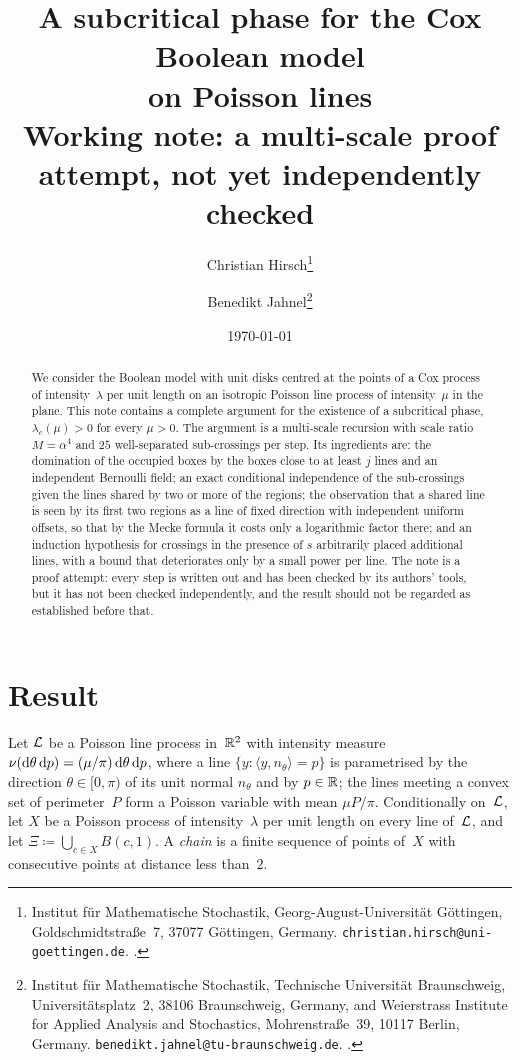 \documentclass[11pt,letterpaper]{article}
\title{\textbf{A subcritical phase for the Cox Boolean model\\ on Poisson lines}\\[0.6em] \large Working note: a multi-scale proof attempt, not yet independently checked}
\author{%
  Christian Hirsch\thanks{Institut f\"ur Mathematische Stochastik, Georg-August-Universit\"at G\"ottingen, Goldschmidtstra\ss e~7, 37077 G\"ottingen, Germany. \texttt{christian.hirsch@uni-goettingen.de}. \orcid{0000-0003-4136-3740}.}
  \and
  Benedikt Jahnel\thanks{Institut f\"ur Mathematische Stochastik, Technische Universit\"at Braunschweig, Universit\"atsplatz~2, 38106 Braunschweig, Germany, and Weierstrass Institute for Applied Analysis and Stochastics, Mohrenstra\ss e~39, 10117 Berlin, Germany. \texttt{benedikt.jahnel@tu-braunschweig.de}. \orcid{0000-0002-4212-0065}.}%
}
\date{\today}
\begin{document}
\maketitle
\thispagestyle{plain}

\begin{abstract}
We consider the Boolean model with unit disks centred at the points of a Cox process of intensity~$\lambda$ per unit length on an isotropic Poisson line process of intensity~$\mu$ in the plane. This note contains a complete argument for the existence of a subcritical phase, $\lambda_c(\mu)>0$ for every $\mu>0$. The argument is a multi-scale recursion with scale ratio $M=\alpha^{4}$ and $25$ well-separated sub-crossings per step. Its ingredients are: the domination of the occupied boxes by the boxes close to at least $j$ lines and an independent Bernoulli field; an exact conditional independence of the sub-crossings given the lines shared by two or more of the regions; the observation that a shared line is seen by its first two regions as a line of fixed direction with independent uniform offsets, so that by the Mecke formula it costs only a logarithmic factor there; and an induction hypothesis for crossings in the presence of $s$ arbitrarily placed additional lines, with a bound that deteriorates only by a small power per line. The note is a proof attempt: every step is written out and has been checked by its authors' tools, but it has not been checked independently, and the result should not be regarded as established before that.
\end{abstract}

\section{Result}
\label{sec:result}

Let $\mathcal L$ be a Poisson line process in~$\mathbb R^2$ with intensity measure $\nu(\mathrm{d}\theta\,\mathrm{d} p)=(\mu/\pi)\,\mathrm{d}\theta\,\mathrm{d} p$, where a line $\{y\colon\langle y,n_\theta\rangle=p\}$ is parametrised by the direction $\theta\in[0,\pi)$ of its unit normal $n_\theta$ and by $p\in\mathbb R$; the lines meeting a convex set of perimeter~$P$ form a Poisson variable with mean $\mu P/\pi$. Conditionally on~$\mathcal L$, let $X$ be a Poisson process of intensity~$\lambda$ per unit length on every line of~$\mathcal L$, and let $\Xi\coloneqq\bigcup_{c\in X}B(c,1)$. A \emph{chain} is a finite sequence of points of~$X$ with consecutive points at distance less than~$2$.
\end{document}
